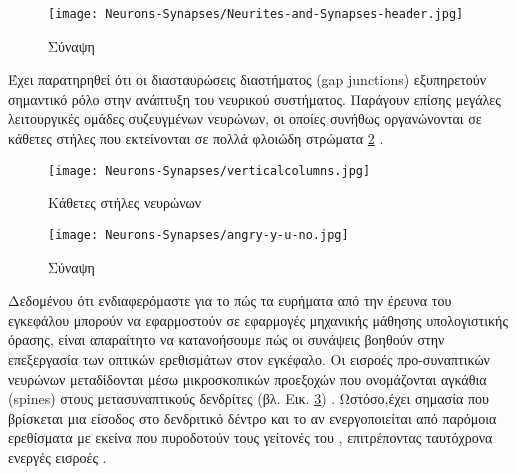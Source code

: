 \documentclass[12pt]{report}
\begin{document}
\begin{figure}[htp]
    \centering
    \texttt{[image: Neurons-Synapses/Neurites-and-Synapses-header.jpg]}
    \caption{Σύναψη}
    \label{fig:synapse}
\end{figure}

Έχει παρατηρηθεί ότι οι διασταυρώσεις διαστήματος (\textlatin{gap junctions}) εξυπηρετούν σημαντικό ρόλο στην ανάπτυξη του νευρικού συστήματος. Παράγουν επίσης μεγάλες λειτουργικές ομάδες συζευγμένων νευρώνων, οι οποίες συνήθως οργανώνονται σε κάθετες στήλες που εκτείνονται σε πολλά φλοιώδη στρώματα \cite{Fischbach1972} \cite{Peinado1993} \cite{Yuste1992} \ref{fig:verticalcolumns} .

\begin{figure}[htp]
    \centering
    \texttt{[image: Neurons-Synapses/verticalcolumns.jpg]}
    \caption{Κάθετες στήλες νευρώνων \cite{molnar2020}}
    \label{fig:verticalcolumns}
\end{figure}
\begin{figure}[htp]
    \centering
    \texttt{[image: Neurons-Synapses/angry-y-u-no.jpg]}
    \caption{Σύναψη}
    \label{fig:spines}
\end{figure}

Δεδομένου ότι ενδιαφερόμαστε για το πώς τα ευρήματα από την έρευνα του εγκεφάλου μπορούν να εφαρμοστούν σε εφαρμογές μηχανικής μάθησης υπολογιστικής όρασης, είναι απαραίτητο να κατανοήσουμε πώς οι συνάψεις βοηθούν στην επεξεργασία των οπτικών ερεθισμάτων στον εγκέφαλο. Οι εισροές προ-συναπτικών νευρώνων μεταδίδονται μέσω μικροσκοπικών προεξοχών που ονομάζονται αγκάθια (\textlatin{spines}) στους μετασυναπτικούς δενδρίτες (βλ. Εικ. \ref{fig:spines}) \cite{tobias2017}. Ωστόσο,έχει σημασία που βρίσκεται μια είσοδος στο δενδριτικό δέντρο και το αν ενεργοποιείται από παρόμοια ερεθίσματα με εκείνα που πυροδοτούν τους γείτονές του , επιτρέποντας ταυτόχρονα ενεργές εισροές \cite{London2005}.
\end{document}

